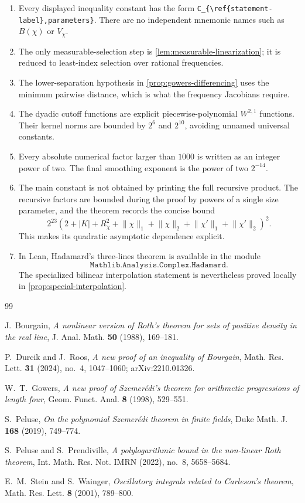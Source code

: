 \documentclass[11pt]{article}
\theoremstyle{definition}
\theoremstyle{remark}
\newcommand{\1}{\mathbf 1}
\newcommand{\lpNorm}[2]{\lVert #1\rVert_{#2}}
\begin{document}
\begin{enumerate}[label=\arabic*.,leftmargin=2em]
\item Every displayed inequality constant has the form
\texttt{C\_\{\textbackslash ref\{statement-label\},parameters\}}.
There are no independent mnemonic names such as $B(\chi)$ or $V_\chi$.
\item The only measurable-selection step is \cref{lem:measurable-linearization}; it is reduced to least-index selection over rational frequencies.
\item The lower-separation hypothesis in \cref{prop:gowers-differencing} uses the minimum pairwise distance, which is what the frequency Jacobians require.
\item The dyadic cutoff functions are explicit piecewise-polynomial $W^{2,1}$ functions.  Their kernel norms are bounded by $2^6$ and $2^{10}$, avoiding unnamed universal constants.
\item Every absolute numerical factor larger than $1000$ is written as an integer power of two.  The final smoothing exponent is the power of two $2^{-14}$.
\item The main constant is not obtained by printing the full recursive product.  The recursive factors are bounded during the proof by powers of a single size parameter, and the theorem records the concise bound
\[
2^{23}
\left(
2+\lvert K\rvert+R_\chi^2
+\lpNorm\chi1+\lpNorm\chi2
+\lpNorm{\chi'}1+\lpNorm{\chi'}2
\right)^2.
\]
This makes its quadratic asymptotic dependence explicit.
\item In Lean, Hadamard's three-lines theorem is available in the module
\[
\texttt{Mathlib.Analysis.Complex.Hadamard}.
\]
The specialized bilinear interpolation statement is nevertheless proved locally in \cref{prop:special-interpolation}.
\end{enumerate}

\begin{thebibliography}{99}

J.~Bourgain,
\emph{A nonlinear version of Roth's theorem for sets of positive density in the real line},
J. Anal. Math. \textbf{50} (1988), 169--181.

P.~Durcik and J.~Roos,
\emph{A new proof of an inequality of Bourgain},
Math. Res. Lett. \textbf{31} (2024), no.~4, 1047--1060;
arXiv:2210.01326.

W.~T.~Gowers,
\emph{A new proof of Szemer\'edi's theorem for arithmetic progressions of length four},
Geom. Funct. Anal. \textbf{8} (1998), 529--551.

S.~Peluse,
\emph{On the polynomial Szemer\'edi theorem in finite fields},
Duke Math. J. \textbf{168} (2019), 749--774.

S.~Peluse and S.~Prendiville,
\emph{A polylogarithmic bound in the non-linear Roth theorem},
Int. Math. Res. Not. IMRN (2022), no.~8, 5658--5684.

E.~M.~Stein and S.~Wainger,
\emph{Oscillatory integrals related to Carleson's theorem},
Math. Res. Lett. \textbf{8} (2001), 789--800.

\end{thebibliography}
\end{document}
